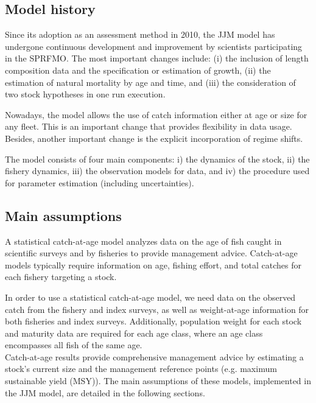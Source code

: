 \documentclass{article}
\begin{document}
\subsection{Model history}

Since its adoption as an assessment method in 2010, the JJM model has undergone continuous development and improvement by scientists participating in the SPRFMO. The most important changes include: (i) the inclusion of length composition data and the specification or estimation of growth, (ii) the estimation of natural mortality by age and time, and (iii) the consideration of two stock hypotheses in one run execution.

Nowadays, the model allows the use of catch information either at age or size for any fleet. This is an important change that provides flexibility in data usage. Besides, another important change is the explicit incorporation of regime shifts. %

The model consists of four main components: i) the dynamics of the stock, ii) the fishery dynamics, iii) the observation models for data, and iv) the procedure used for parameter estimation (including uncertainties).

\subsection{Main assumptions}

A statistical catch-at-age model analyzes data on the age of fish caught in scientific surveys and by fisheries to provide management advice. Catch-at-age models typically require information on %
age, fishing effort, and total catches for each fishery targeting a stock.

In order to use a statistical catch-at-age model, we need data on the observed catch from the fishery and index surveys, as well as weight-at-age information for both fisheries and index surveys. Additionally, population weight for each stock and maturity data are required for each age class, where an age class encompasses all fish of the same age.\\
Catch-at-age results provide comprehensive management advice by estimating a stock's current size and the management reference points (e.g. maximum sustainable yield (MSY)). The main assumptions of these models, implemented in the JJM model, are detailed in the following sections.
\end{document}
